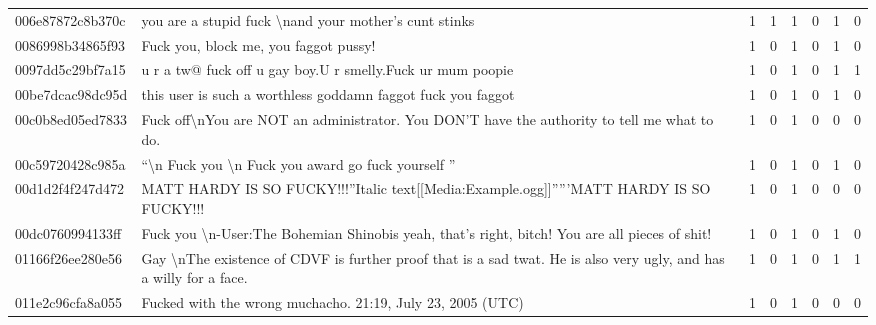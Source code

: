 \begin{center}
\begin{sidewaystable}[htb]
\begin{tabularx}{\textwidth}{L{0.8} L{6.6} C{0.1} C{0.1} C{0.1} C{0.1} C{0.1} C{0.1}}
            006e87872c8b370c & you are a stupid fuck \textbackslash nand your mother's cunt stinks                                                              & 1           & 1           & 1           & 0           & 1           & 0           \\
            0086998b34865f93 & Fuck you, block me, you faggot pussy!                                                                                            & 1           & 0           & 1           & 0           & 1           & 0           \\
            0097dd5c29bf7a15 & u r a tw@ fuck off u gay boy.U r smelly.Fuck ur mum poopie                                                                       & 1           & 0           & 1           & 0           & 1           & 1           \\
            00be7dcac98dc95d & this user is such a worthless goddamn faggot fuck you faggot                                                                     & 1           & 0           & 1           & 0           & 1           & 0           \\
            00c0b8ed05ed7833 & Fuck off\textbackslash nYou are NOT an administrator. You DON'T have the authority to tell me what to do.                        & 1           & 0           & 1           & 0           & 0           & 0           \\
            00c59720428c985a & ``\textbackslash n Fuck you \textbackslash n Fuck you award go fuck yourself ''                                                  & 1           & 0           & 1           & 0           & 1           & 0           \\
            00d1d2f4f247d472 & MATT HARDY IS SO FUCKY!!!''Italic text[[Media:Example.ogg]]'''''MATT HARDY IS SO FUCKY!!!                                        & 1           & 0           & 1           & 0           & 0           & 0           \\
            00dc0760994133ff & Fuck you \textbackslash n-User:The Bohemian Shinobis yeah, that's right, bitch! You are all pieces of shit!                      & 1           & 0           & 1           & 0           & 1           & 0           \\
            01166f26ee280e56 & Gay \textbackslash nThe existence of CDVF is further proof that is a sad twat. He is also very ugly, and has a willy for a face. & 1           & 0           & 1           & 0           & 1           & 1           \\
            011e2c96cfa8a055 & Fucked with the wrong muchacho. 21:19, July 23, 2005 (UTC)                                                                       & 1           & 0           & 1           & 0           & 0           & 0           \\

\end{tabularx}
\end{sidewaystable}
\end{center}
